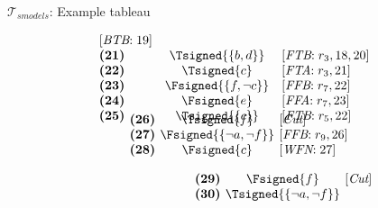 \begin{frame}{$\mathcal{T}_{\textit{smodels}}$: Example tableau}
\begin{center}
\begin{minipage}[t]{16cm}
\begin{minipage}[t]{6cm}
\[\begin{array}{lcl}
  [\textit{BTB}{:}\;\text{19}]                     \\
\textbf{(21)}                                      &
  \Tsigned{\{b,d\}}                                &
  [\textit{FTB}{:}\;r_3, \text{18}, \text{20}]     \\
\textbf{(22)}                                      &
  \Tsigned{c}                                      &
  [\textit{FTA}{:}\;r_3, \text{21}]                \\
\textbf{(23)}                                      &
  \Fsigned{\{f,\neg c\}}                   &
  [\textit{FFB}{:}\;r_7, \text{22}]                \\
\textbf{(24)}                                      &
  \Fsigned{e}                                      &
  [\textit{FFA}{:}\;r_7, \text{23}]                \\
\textbf{(25)}                                      &
  \Tsigned{\{c\}}                                  &
  [\textit{FTB}{:}\;r_5, \text{22}]
\vspace{-0.7cm}
\end{array}
\]
%
\begin{minipage}[t]{1cm}
\[
\hspace{0.25cm}
\begin{array}{l@{~~}c@{~~}l}
\textbf{(26)}                                      &
  \Tsigned{f}                                      &
  [\textit{Cut}]                                   \\
\textbf{(27)}                                      & \hspace{-0.1cm}
  \Fsigned{\{\neg a,\neg f\}}      \hspace{-0.1cm} &
  [\textit{FFB}{:}\;r_9, \text{26}]                \\
\textbf{(28)}                                      &
  \Fsigned{c}                                      &
  [\textit{WFN}{:}\;\text{27}]
\end{array}
\]
\end{minipage}
%
\begin{minipage}[t]{2cm}
\[
\hspace{2.75cm}
\begin{array}{l@{~~}c@{~~}l}
\textbf{(29)}                                      &
  \Fsigned{f}                                      &
  [\textit{Cut}]                                   \\
\textbf{(30)}                                      & \hspace{-0.1cm}
  \Tsigned{\{\neg a,\neg f\}}      \hspace{-0.1cm} &

\end{array}\]
\end{minipage}
\end{minipage}
\end{minipage}
\end{center}
\end{frame}

